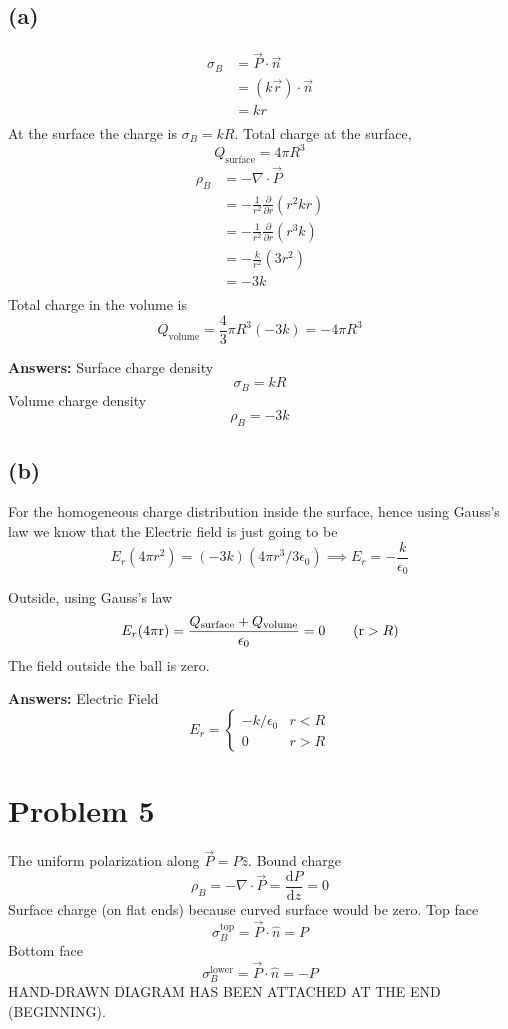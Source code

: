 \documentclass[letter, 10pts]{article}
\begin{document}
\subsection*{(a)} 
\begin{align*}
\sigma_B &= \vec{P} \cdot \vec{n} 
\\
&= (k \vec{r}) \cdot  \vec{n}  \\
&= kr \\
\end{align*} 
At the surface the charge is $\sigma_B = k R$. Total charge at the surface, 
\[
Q_\text{surface} = 4 \pi R^3
\] 
\begin{align*}
\rho_B &= - \nabla \cdot  \vec{P} \\
&= -\frac{1}{r^2} \frac{\partial }{\partial r}(r^2 k r)  \\
&= -\frac{1}{r^2} \frac{\partial}{\partial r}(r^3 k)  \\
&= -\frac{k}{r^2} (3 r^2 )  \\
&= -3k \\
\end{align*}
Total charge in the volume is 
\[
Q_\text{volume} = \frac{4}{3} \pi R^3 (- 3 k) = - 4 \pi R^3 
\] 

\textbf{Answers:}
Surface charge density \[
\boxed{
\sigma_B = kR
}
\] 
Volume charge density 
\[
\boxed{
\rho_B = - 3k
}
\] 

\subsection*{(b)} 
For the homogeneous charge distribution inside the surface, hence using Gauss's law we know that the Electric field is just going to be 
\[
	E_r (4 \pi r^2) = (-3k) (4 \pi r^3 / 3\epsilon_0) 
	\implies 
	E_r = - \frac{k}{\epsilon_0}\tag{$r < R$}
\] 

Outside, using Gauss's law
\[
	E_r (4 \pi \mathrm{r}   ) = \frac{Q_\text{surface} + Q_\text{volume} }{\epsilon_0} = 0   
	\tag{$\mathrm{r} > R $}
\]  
The field outside the ball is zero. 

\textbf{Answers:} Electric Field \[
\boxed{E_r =
\begin{cases}
 - k / \epsilon_0 & r < R\\
	 0 & r > R 
\end{cases}} 
\] 




\section*{Problem 5} 
The uniform polarization along $\vec{P} = P \hat{z}$. 
Bound charge 
\[
\rho_B = - \nabla \cdot  \vec{P} = \frac{\mathrm{d} P}{\mathrm{d}z } = 0
\] 
Surface charge (on flat ends) because curved surface would be zero. Top face
\[
\sigma^{\text{top}}_B = \vec{P} \cdot \hat{n} = P
\]
Bottom face
\[
\sigma^{\text{lower}}_B = \vec{P} \cdot  \hat{n} = -P 
\] 
HAND-DRAWN DIAGRAM HAS BEEN ATTACHED AT THE END (BEGINNING).
\end{document}

